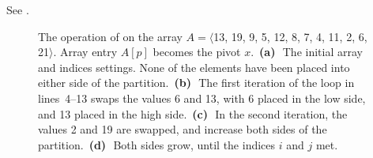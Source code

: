 See .
\begin{figure}[htb]
    \captionsetup[subfigure]{skip=-.8\cellsize, slc=off}
    \par\vspace{.5\cellsize}
    \par\vspace{.5\cellsize}
    \par\vspace{.5\cellsize}
    \caption{The operation of  on the array $A=\langle$13, 19, 9, 5, 12, 8, 7, 4, 11, 2, 6, 21$\rangle$.
    Array entry $A[p]$ becomes the pivot $x$.\,
    \textbf{(a)}\,~The initial array and indices settings.
    None of the elements have been placed into either side of the partition.\,
    \textbf{(b)}\,~The first iteration of the  loop in lines~4--13 swaps the values 6 and 13, with 6 placed in the low side, and 13 placed in the high side.\,
    \textbf{(c)}\,~In the second iteration, the values 2 and 19 are swapped, and increase both sides of the partition.\,
    \textbf{(d)}\,~Both sides grow, until the indices $i$ and $j$ met.} \label{fig:7-1}
\end{figure}
